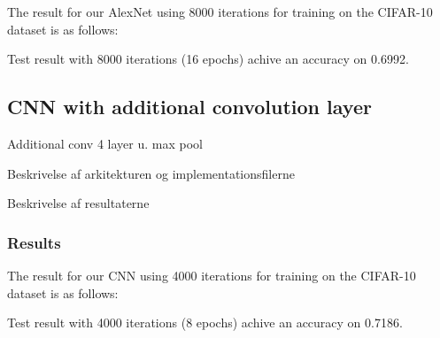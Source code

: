 The result for our AlexNet using 8000 iterations for training on the CIFAR-10
dataset is as follows: 

Test result with 8000 iterations (16 epochs) achive an accuracy on 0.6992. 


\subsection{CNN with additional convolution layer} %
\label{sub:cnn}


Additional conv 4 layer u. max pool



Beskrivelse af arkitekturen og implementationsfilerne

Beskrivelse af resultaterne

\subsubsection{Results}

The result for our CNN using 4000 iterations for training on the CIFAR-10
dataset is as follows: 

Test result with 4000 iterations (8 epochs) achive an accuracy on 	0.7186.


